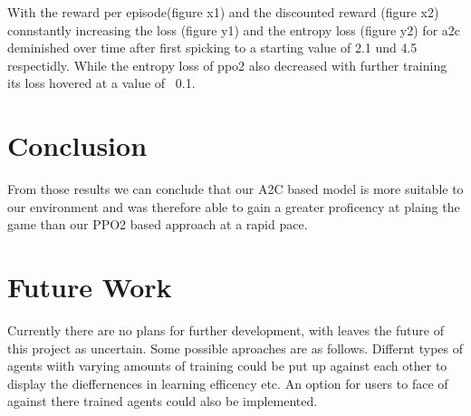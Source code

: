 \documentclass[sigconf]{acmart}
\begin{document}
With the reward per episode(figure x1) and the discounted reward (figure x2) connstantly increasing the loss (figure y1) and the entropy loss (figure y2) for a2c deminished over time after first spicking to a starting value of 2.1 und 4.5 respectidly. While the entropy loss of ppo2 also decreased with further training its loss hovered at a value of ~0.1.



\section{Conclusion}
 From those results we can conclude that our A2C based model is more suitable to our environment and was therefore able to gain a greater proficency at plaing the game than our PPO2 based approach at a rapid pace. 
  
\section{Future Work}
Currently there are no plans for further development, with leaves the future of  this project as uncertain. Some possible aproaches are as follows. 
Differnt types of agents wiith varying amounts of training could be put up against each other to display the dieffernences in learning efficency etc. An option for users to face of against there trained agents could also be implemented.
\end{document}
